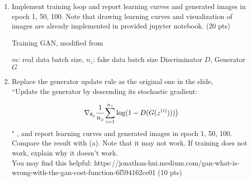 \documentclass[a4paper]{article}
\theoremstyle{definition}
\begin{document}
	\begin{enumerate} [label=(\alph*)]
		\item Implement training loop and report learning curves and generated images in epoch 1, 50, 100. Note that drawing learning curves and visualization of images are already implemented in provided jupyter notebook. \hfill (20 pts)
		
		\begin{algorithm}
			\caption{Training GAN, modified from \cite{goodfellow2014generative}}\label{alg:GAN}
			\begin{algorithmic}
				\Require $m$: real data batch size, $n_{z}$: fake data batch size
				\Ensure Discriminator $D$, Generator $G$
				
				
				
				\EndFor
				
			\end{algorithmic}
		\end{algorithm}
		
		
		

		
		
	
		
		\item Replace the generator update rule as the original one in the slide,\\
		``Update the generator by descending its stochastic gradient:
		
		$$\nabla_{\theta_{g}}  \cfrac{1}{n_{z}}  \sum_{i=1}^{n_{z}}\log (1-D(G(z^{(i)})))\big )$$
		"
		, and report learning curves and generated images in epoch 1, 50, 100. Compare the result with (a). Note that it may not work. If training does not work, explain why it doesn't work. \\
        You may find this helpful: https://jonathan-hui.medium.com/gan-what-is-wrong-with-the-gan-cost-function-6f594162ce01
		\hfill (10 pts)
		

\end{enumerate}
\end{document}
